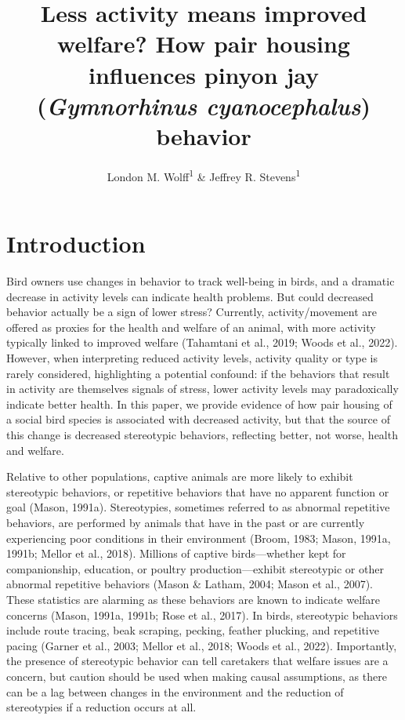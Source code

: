 \documentclass[
  pub]{apa6}
\title{Less activity means improved welfare? How pair housing influences pinyon jay (\emph{Gymnorhinus cyanocephalus}) behavior}
\author{London M. Wolff\textsuperscript{1} \& Jeffrey R. Stevens\textsuperscript{1}}
\date{}
\affiliation{\vspace{0.5cm}\textsuperscript{1} Department of Psychology, Center for Brain, Biology \& Behavior, University of Nebraska, Lincoln, Lincoln, NE, USA}
\begin{document}
\maketitle

\hypertarget{introduction}{%
\section{Introduction}\label{introduction}}

Bird owners use changes in behavior to track well-being in birds, and a dramatic decrease in activity levels can indicate health problems. But could decreased behavior actually be a sign of lower stress? Currently, activity/movement are offered as proxies for the health and welfare of an animal, with more activity typically linked to improved welfare (Tahamtani et al., 2019; Woods et al., 2022). However, when interpreting reduced activity levels, activity quality or type is rarely considered, highlighting a potential confound: if the behaviors that result in activity are themselves signals of stress, lower activity levels may paradoxically indicate better health. In this paper, we provide evidence of how pair housing of a social bird species is associated with decreased activity, but that the source of this change is decreased stereotypic behaviors, reflecting better, not worse, health and welfare.

Relative to other populations, captive animals are more likely to exhibit stereotypic behaviors, or repetitive behaviors that have no apparent function or goal (Mason, 1991a). Stereotypies, sometimes referred to as abnormal repetitive behaviors, are performed by animals that have in the past or are currently experiencing poor conditions in their environment (Broom, 1983; Mason, 1991a, 1991b; Mellor et al., 2018). Millions of captive birds---whether kept for companionship, education, or poultry production---exhibit stereotypic or other abnormal repetitive behaviors (Mason \& Latham, 2004; Mason et al., 2007). These statistics are alarming as these behaviors are known to indicate welfare concerns (Mason, 1991a, 1991b; Rose et al., 2017). In birds, stereotypic behaviors include route tracing, beak scraping, pecking, feather plucking, and repetitive pacing (Garner et al., 2003; Mellor et al., 2018; Woods et al., 2022). Importantly, the presence of stereotypic behavior can tell caretakers that welfare issues are a concern, but caution should be used when making causal assumptions, as there can be a lag between changes in the environment and the reduction of stereotypies if a reduction occurs at all.
\end{document}
